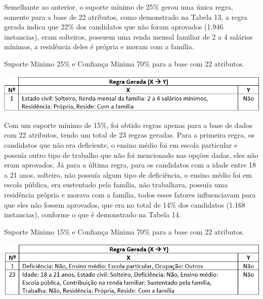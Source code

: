 \par
Semelhante ao anterior, o suporte mínimo de 25\% gerou uma única regra, somente para a base de 22 atributos, como demonstrado na Tabela 13, a regra gerada indica que 22\% dos candidatos que não foram aprovados (1.946 instancias), eram solteiros, possuem uma renda mensal familiar de 2 a 4 salários mínimos, a residência deles é própria e moram com a família.

\par
\begin{table}[!htp]
	\begin{center}
    \caption{\label{fig:waveform_fig} Suporte Mínimo 25\% e Confiança Mínima 70\% para a base com 22 atributos.}
	\includegraphics[scale=0.75]{Figuras/Suporte_25_Nao_atributos_22.png}
	\end{center}
\end{table}

\par
Com um suporte mínimo de 15\%, foi obtido regras apenas para a base de dados com 22 atributos, tendo um total de 23 regras geradas. Para a primeira regra, os candidatos que não era deficiente, o ensino médio foi em escola particular e possuía outro tipo de trabalho que não foi mencionado nas opções dadas, eles não eram aprovados. Já para a última regra, para os candidatos com a idade entre 18 a 21 anos, solteiro, não possuía algum tipo de deficiência, o ensino médio foi em escola pública, era sustentado pela família, não trabalhava, possuía uma residência própria e morava com a família, todos esses fatores influenciavam para que eles não fossem aprovados, que era no total de 14\% dos candidatos (1.168 instancias), conforme o que é demonstrado na Tabela 14.

\par
\begin{table}[!htp]
	\begin{center}
    \caption{\label{fig:waveform_fig} Suporte Mínimo 15\% e Confiança Mínima 70\% para a base com 22 atributos.}
	\includegraphics[scale=0.75]{Figuras/Suporte_15_Nao_atributos_22.png}
	\end{center}
\end{table}


